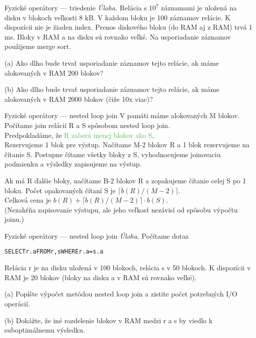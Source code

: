 \documentclass[12pt]{beamer}
\def\green#1{\textcolor{LimeGreen}{#1}}
\begin{document}
\begin{frame}[fragile]{Fyzické operátory --- triedenie}
\emph{Úloha.}
Relácia s $10^7$ záznamami je uložená na disku v blokoch veľkosti 8 kB.
V každom bloku je 100 záznamov relácie. K dispozícii nie je žiaden index.
Prenos diskového bloku (do RAM aj z RAM) trvá 1 ms.
Bloky v RAM a na disku sú rovnako veľké.
Na usporiadanie záznamov použijeme \alert{merge sort}.

(a) Ako dlho bude trvať usporiadanie záznamov tejto relácie,
ak máme alokovaných v RAM 200 blokov?

(b) Ako dlho bude trvať usporiadanie záznamov tejto relácie,
ak máme alokovaných v RAM 2000 blokov (čiže 10x viac)?
\end{frame}

\begin{frame}[fragile]{Fyzické operátory --- nested loop join}
V pamäti máme alokovaných M blokov. Počítame join relácií R a S spôsobom \alert{nested loop join}.\\
Predpokladáme, že \green{R zaberá menej blokov ako S}.\\[3mm]

Rezervujeme 1 blok pre výstup. Načítame M-2 blokov R a 1 blok rezervujeme na čítanie S.
Postupne čítame všetky bloky z S, vyhodnocujeme joinovaciu podmienku a výsledky zapisujeme na výstup.

Ak má R ďalšie bloky, načítame B-2 blokov R a zopakujeme čítanie celej S po 1 bloku.
Počet opakovaných čítaní S je $\lceil b(R) / (M-2)\rceil$.\\[3mm]

Celková cena je $b(R) + \lceil b(R) / (M-2)\rceil\cdot b(S)$.\\
(Nezahŕňa zapisovanie výstupu, ale jeho veľkosť nezávisí od spôsobu výpočtu joinu.)
\end{frame}

\begin{frame}[fragile]{Fyzické operátory --- nested loop join}
\emph{Úloha.}
Počítame dotaz
\begin{alltt}
  SELECT r.a FROM r, s WHERE r.a = s.a
\end{alltt}
Relácia r je na disku uložená v 100 blokoch, relácia s v 50 blokoch.
K dispozícii v RAM je 20 blokov (bloky na disku a v RAM sú rovnako veľké).

(a) Popíšte výpočet metódou \alert{nested loop join}
a zistite počet potrebných I/O operácií.

(b) Dokážte, že iné rozdelenie blokov v RAM medzi r a s by viedlo k suboptimálnemu výsledku.
\end{frame}
\end{document}
